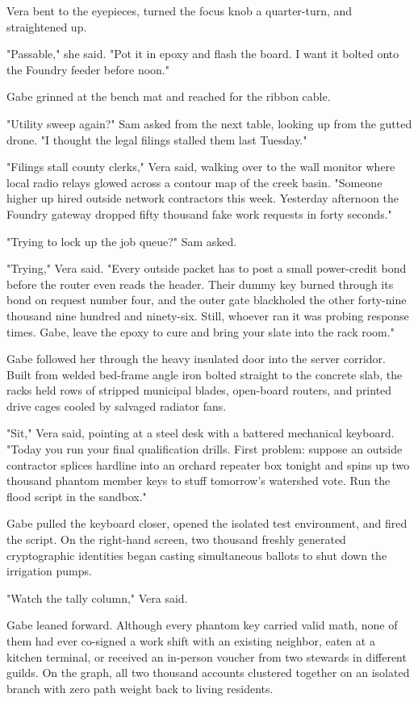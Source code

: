 Vera bent to the eyepieces, turned the focus knob a quarter-turn, and straightened up.

"Passable," she said. "Pot it in epoxy and flash the board. I want it bolted onto the Foundry feeder before noon."

Gabe grinned at the bench mat and reached for the ribbon cable.

"Utility sweep again?" Sam asked from the next table, looking up from the gutted drone. "I thought the legal filings stalled them last Tuesday."

"Filings stall county clerks," Vera said, walking over to the wall monitor where local radio relays glowed across a contour map of the creek basin. "Someone higher up hired outside network contractors this week. Yesterday afternoon the Foundry gateway dropped fifty thousand fake work requests in forty seconds."

"Trying to lock up the job queue?" Sam asked.

"Trying," Vera said. "Every outside packet has to post a small power-credit bond before the router even reads the header. Their dummy key burned through its bond on request number four, and the outer gate blackholed the other forty-nine thousand nine hundred and ninety-six. Still, whoever ran it was probing response times. Gabe, leave the epoxy to cure and bring your slate into the rack room."

Gabe followed her through the heavy insulated door into the server corridor. Built from welded bed-frame angle iron bolted straight to the concrete slab, the racks held rows of stripped municipal blades, open-board routers, and printed drive cages cooled by salvaged radiator fans.

"Sit," Vera said, pointing at a steel desk with a battered mechanical keyboard. "Today you run your final qualification drills. First problem: suppose an outside contractor splices hardline into an orchard repeater box tonight and spins up two thousand phantom member keys to stuff tomorrow's watershed vote. Run the flood script in the sandbox."

Gabe pulled the keyboard closer, opened the isolated test environment, and fired the script. On the right-hand screen, two thousand freshly generated cryptographic identities began casting simultaneous ballots to shut down the irrigation pumps.

"Watch the tally column," Vera said.

Gabe leaned forward. Although every phantom key carried valid math, none of them had ever co-signed a work shift with an existing neighbor, eaten at a kitchen terminal, or received an in-person voucher from two stewards in different guilds. On the graph, all two thousand accounts clustered together on an isolated branch with zero path weight back to living residents.

